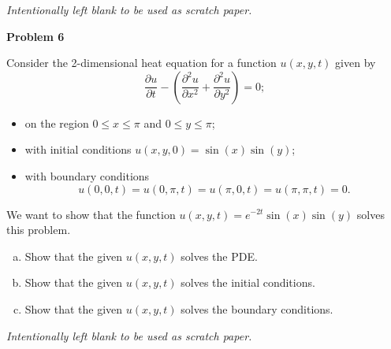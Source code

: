 \documentclass[12pt]{amsbook}
\begin{document}
\newpage
\emph{Intentionally left blank to be used as scratch paper.}\\












\newpage

\textbf{Problem 6}

\vspace{.25cm}

Consider the 2-dimensional heat equation for a function $u(x,y,t)$ given by
\[
\frac{\partial u}{\partial t} - \left( \frac{\partial^2 u}{\partial x^2} + \frac{\partial^2 u}{\partial y^2}\right) = 0;
\]
\begin{itemize}
    \item on the region $0\leq x \leq \pi$ and $0\leq y \leq \pi$;
    \item with initial conditions $u(x,y,0)=\sin(x)\sin(y)$; 
    \item with boundary conditions 
    \[
    u(0,0,t)=u(0,\pi,t)=u(\pi,0,t)=u(\pi,\pi,t)=0.
    \]
\end{itemize}
We want to show that the function $u(x,y,t)=e^{-2t}\sin(x)\sin(y)$ solves this problem.
\vspace{.5cm}
\begin{enumerate}[(a)]
    \item Show that the given $u(x,y,t)$ solves the PDE.
    \vspace*{5cm}
    \item Show that the given $u(x,y,t)$ solves the initial conditions.
    \vspace*{5cm}
    \item Show that the given $u(x,y,t)$ solves the boundary conditions.
\end{enumerate}







\newpage
\emph{Intentionally left blank to be used as scratch paper.}\\
\end{document}
